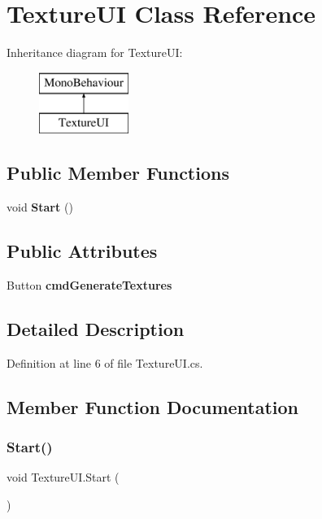 \section{Texture\+UI Class Reference}
\label{class_texture_u_i}
Inheritance diagram for Texture\+UI\+:\begin{figure}[H]
\begin{center}
\leavevmode
\includegraphics[height=2.000000cm]{class_texture_u_i}
\end{center}
\end{figure}
\subsection*{Public Member Functions}
\begin{DoxyCompactItemize}
\item 
void \textbf{ Start} ()
\end{DoxyCompactItemize}
\subsection*{Public Attributes}
\begin{DoxyCompactItemize}
\item 
Button \textbf{ cmd\+Generate\+Textures}
\end{DoxyCompactItemize}


\subsection{Detailed Description}


Definition at line 6 of file Texture\+U\+I.\+cs.



\subsection{Member Function Documentation}
\mbox{\label{class_texture_u_i_a4be04a76b55cfe05a6204277f88ba5d9}} 
\subsubsection{Start()}
{\footnotesize\ttfamily void Texture\+U\+I.\+Start (\begin{DoxyParamCaption}{ }\end{DoxyParamCaption})}



